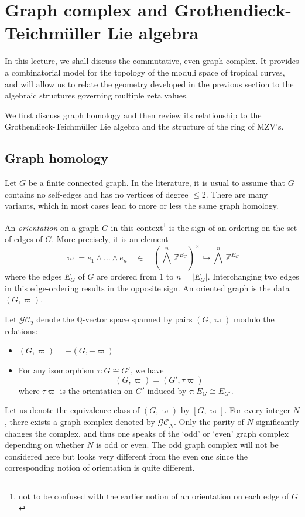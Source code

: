 \documentclass[12pt]{amsart}
\newcommand{\QQ}{{\mathbb Q}}
\newcommand{\ZZ}{{\mathbb Z}}
\theoremstyle{plain}
\newcommand{\GC}{\mathcal{GC}}
\newcommand{\0}{\color{blue}{\mathsf{0}}}
\begin{document}
\section{Graph complex and Grothendieck-Teichm\"uller Lie algebra}

In this lecture, we shall discuss the commutative, even graph complex.  It provides a combinatorial model for the topology of the moduli space of tropical curves, and will allow us to relate the geometry developed in the previous section to the algebraic structures governing multiple zeta values.

We first discuss graph homology and  then  review its relationship to the Grothendieck-Teichm\"uller Lie algebra and the structure of the ring of  MZV's. 





\subsection{Graph homology}
Let $G$ be a finite connected graph. In the literature, it is usual to assume that $G$ contains no self-edges and has no vertices of degree $\leq 2$. There are many variants,  which in most cases lead to more or less the same graph homology. 

An \emph{orientation} on  a graph $G$ in this context\footnote{not to be confused with the earlier notion of an orientation on each edge of $G$} is the sign of an ordering on the set of edges of $G$. More precisely, it is an element
\[  \varpi = e_1 \wedge \ldots \wedge e_{n}  \quad  \in \quad  \left( \textstyle{\bigwedge}^n  \, \ZZ^{E_G}\right)^{\times}\hookrightarrow \textstyle{\bigwedge}^n \,\ZZ^{E_G} \]
where the edges $E_G$ of $G$ are ordered from $1$ to $n=|E_G|$. Interchanging  two edges in this edge-ordering results in the opposite sign. An oriented graph is the data $(G,\varpi)$. 

Let $\GC_2$ denote the $\QQ$-vector space spanned by pairs $(G,\varpi)$ modulo the relations:
\begin{itemize}
\item $(G, \varpi)  =   - (G, -\varpi) $ 
\item For any isomorphism $\tau: G \cong G'$, we have 
\[  (G, \varpi) =  (G', \tau \varpi)\]
where $\tau \varpi$ is the orientation on $G'$ induced by $\tau: E_G \cong E_{G'}$.  
\end{itemize} 
Let us denote the equivalence class of $(G,\varpi)$ by $[G,\varpi]$. 
For every integer $N$, there exists a graph complex denoted by $\GC_N$.  Only the parity of $N$ significantly changes the complex, and thus one speaks of the `odd' or `even' graph complex depending on whether $N$ is odd or even. The odd graph complex will not be considered here but looks very different from the even one since the corresponding notion of orientation is quite different.  
\end{document}
